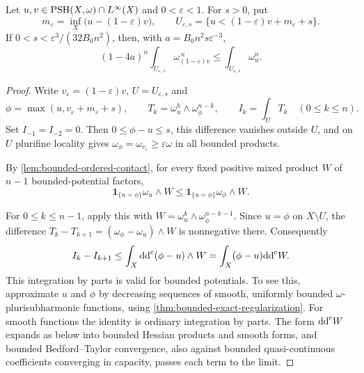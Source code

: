 \begin{theorem}\label{thm:modified-comparison}
Let $u,v\in\mathrm{PSH}(X,\omega)\cap L^\infty(X)$ and $0<\varepsilon<1$. For $s>0$, put
\[
 m_\varepsilon=\inf_X\bigl(u-(1-\varepsilon)v\bigr),\qquad
 U_{\varepsilon,s}=\{u<(1-\varepsilon)v+m_\varepsilon+s\}.
\]
If $0<s<\varepsilon^3/(32B_0n^2)$, then, with
$a=B_0n^2s\varepsilon^{-3}$,
\begin{equation}\label{eq:modified-comparison}
 (1-4a)^n\int_{U_{\varepsilon,s}}\omega_{(1-\varepsilon)v}^{\,n}
 \leq\int_{U_{\varepsilon,s}}\omega_u^n.
\end{equation}
\end{theorem}
\begin{proof}
Write $v_\varepsilon=(1-\varepsilon)v$, $U=U_{\varepsilon,s}$ and
\[
 \phi=\max(u,v_\varepsilon+m_\varepsilon+s),\qquad
 T_k=\omega_u^k\wedge\omega_\phi^{n-k},\qquad I_k=\int_U T_k\quad(0\leq k\leq n).
\]
Set $I_{-1}=I_{-2}=0$. Then $0\leq\phi-u\leq s$, this difference vanishes outside $U$, and on $U$ plurifine locality gives
$\omega_\phi=\omega_{v_\varepsilon}\geq\varepsilon\omega$ in all bounded products.

By \cref{lem:bounded-ordered-contact}, for every fixed positive mixed product $W$ of $n-1$ bounded-potential factors,
\[
 \mathbf1_{\{u=\phi\}}\omega_u\wedge W
 \leq\mathbf1_{\{u=\phi\}}\omega_\phi\wedge W.
\]

For $0\leq k\leq n-1$, apply this with $W=\omega_u^k\wedge\omega_\phi^{n-k-1}$. Since $u=\phi$ on $X\setminus U$, the difference $T_k-T_{k+1}=(\omega_\phi-\omega_u)\wedge W$ is nonnegative there. Consequently
\begin{equation}\label{eq:comparison-stokes}
 I_k-I_{k+1}
 \leq\int_X\mathrm{dd}^{\mathrm{c}}(\phi-u)\wedge W
 =\int_X(\phi-u)\mathrm{dd}^{\mathrm{c}} W.
\end{equation}
This integration by parts is valid for bounded potentials. To see this, approximate $u$ and $\phi$ by decreasing sequences of smooth, uniformly bounded $\omega$-plurisubharmonic functions, using \cref{thm:bounded-exact-regularization}. For smooth functions the identity is ordinary integration by parts. The form $\mathrm{dd}^{\mathrm{c}} W$ expands as below into bounded Hessian products and smooth forms, and bounded Bedford--Taylor convergence, also against bounded quasi-continuous coefficients converging in capacity, passes each term to the limit.


\end{proof}
